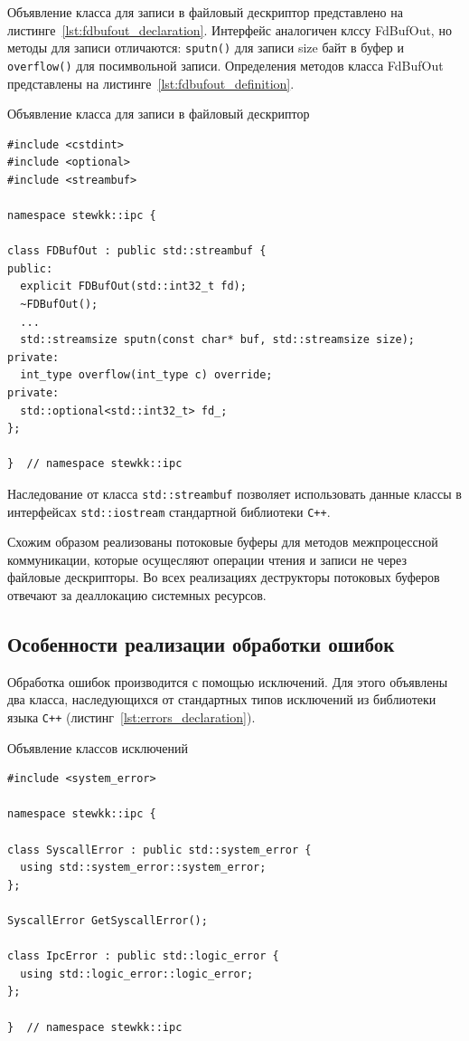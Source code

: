 \documentclass[14pt, russian]{scrartcl}
\newcommand{\refAlgo}[1]{(листинг~\ref{#1})}
\begin{document}
Объявление класса для записи в файловый дескриптор представлено на
листинге~\ref{lst:fdbufout_declaration}. Интерфейс аналогичен клссу FdBufOut, но
методы для записи отличаются: \verb|sputn()| для записи size байт в буфер и
\verb|overflow()| для посимвольной записи. Определения методов класса FdBufOut
представлены на листинге~\ref{lst:fdbufout_definition}.

\begin{listing}
  \caption{Объявление класса для записи в файловый дескриптор}
  \label{lst:fdbufout_declaration}
  \begin{verbatim}
#include <cstdint>
#include <optional>
#include <streambuf>

namespace stewkk::ipc {

class FDBufOut : public std::streambuf {
public:
  explicit FDBufOut(std::int32_t fd);
  ~FDBufOut();
  ...
  std::streamsize sputn(const char* buf, std::streamsize size);
private:
  int_type overflow(int_type c) override;
private:
  std::optional<std::int32_t> fd_;
};

}  // namespace stewkk::ipc
  \end{verbatim}
\end{listing}

Наследование от класса \verb|std::streambuf| позволяет использовать данные
классы в интерфейсах \verb|std::iostream| стандартной библиотеки \verb|C++|.

Схожим образом реализованы потоковые буферы для методов межпроцессной
коммуникации, которые осущесляют операции чтения и записи не через файловые
дескрипторы. Во всех реализациях деструкторы потоковых буферов отвечают за
деаллокацию системных ресурсов.

\subsection{Особенности реализации обработки ошибок}

Обработка ошибок производится с помощью исключений. Для этого объявлены два
класса, наследующихся от стандартных типов исключений из библиотеки языка
\verb|C++| \refAlgo{lst:errors_declaration}.

\begin{listing}[H]
  \caption{Объявление классов исключений}
  \label{lst:errors_declaration}
  \begin{verbatim}
#include <system_error>

namespace stewkk::ipc {

class SyscallError : public std::system_error {
  using std::system_error::system_error;
};

SyscallError GetSyscallError();

class IpcError : public std::logic_error {
  using std::logic_error::logic_error;
};

}  // namespace stewkk::ipc
  \end{verbatim}
\end{listing}
\end{document}

